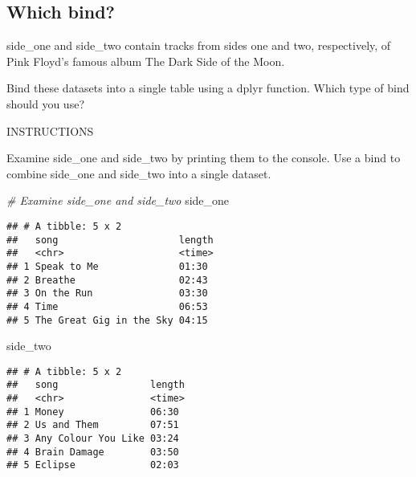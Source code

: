 \documentclass[]{article}
\newenvironment{Shaded}{\begin{snugshade}}{\end{snugshade}}
\newcommand{\KeywordTok}[1]{\textcolor[rgb]{0.13,0.29,0.53}{\textbf{#1}}}
\newcommand{\StringTok}[1]{\textcolor[rgb]{0.31,0.60,0.02}{#1}}
\newcommand{\CommentTok}[1]{\textcolor[rgb]{0.56,0.35,0.01}{\textit{#1}}}
\newcommand{\OperatorTok}[1]{\textcolor[rgb]{0.81,0.36,0.00}{\textbf{#1}}}
\newcommand{\NormalTok}[1]{#1}
\begin{document}
\subsection{Which bind?}\label{which-bind}

side\_one and side\_two contain tracks from sides one and two,
respectively, of Pink Floyd's famous album The Dark Side of the Moon.

Bind these datasets into a single table using a dplyr function. Which
type of bind should you use?

INSTRUCTIONS

Examine side\_one and side\_two by printing them to the console. Use a
bind to combine side\_one and side\_two into a single dataset.

\begin{Shaded}
\begin{Highlighting}[]
\CommentTok{# Examine side_one and side_two}
\NormalTok{side_one}
\end{Highlighting}
\end{Shaded}

\begin{verbatim}
## # A tibble: 5 x 2
##   song                     length
##   <chr>                    <time>
## 1 Speak to Me              01:30 
## 2 Breathe                  02:43 
## 3 On the Run               03:30 
## 4 Time                     06:53 
## 5 The Great Gig in the Sky 04:15
\end{verbatim}

\begin{Shaded}
\begin{Highlighting}[]
\NormalTok{side_two}
\end{Highlighting}
\end{Shaded}

\begin{verbatim}
## # A tibble: 5 x 2
##   song                length
##   <chr>               <time>
## 1 Money               06:30 
## 2 Us and Them         07:51 
## 3 Any Colour You Like 03:24 
## 4 Brain Damage        03:50 
## 5 Eclipse             02:03
\end{verbatim}

\begin{Shaded}
\end{Shaded}
\end{document}
